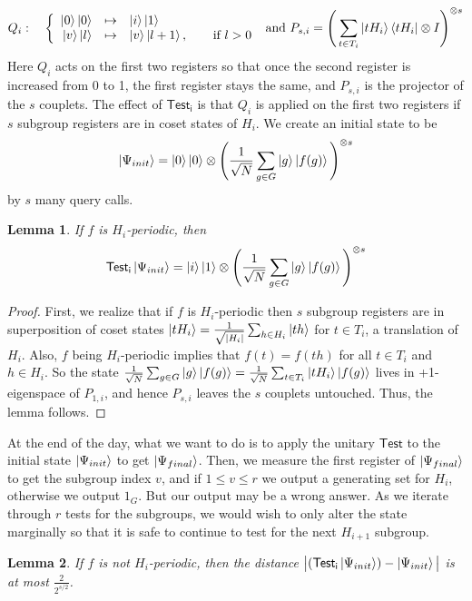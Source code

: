 \documentclass[12pt]{article}
\theoremstyle{plain}
\newtheorem{lem}{Lemma}
\theoremstyle{definition}
\begin{document}
$$Q_i:\quad\left\lbrace
\begin{array}{rcl}
\left\vert{0}\right\rangle\left\vert{0}\right\rangle & \mapsto & \left\vert{i}\right\rangle\left\vert{1}\right\rangle \\
\left\vert{v}\right\rangle\left\vert{l}\right\rangle & \mapsto & \left\vert{v}\right\rangle\left\vert{l+1}\right\rangle,
\qquad\text{if $l>0$}
\end{array}
\right.
\text{ and  } P_{s,i}=\Bigg(\sum_{t\in T_i}\left\vert{tH_i}\right\rangle\left\langle{tH_i}\right\vert\otimes I\Bigg)^{\otimes s}
$$
Here $Q_i$ acts on the first two registers so that once the second register is increased from 0 to 1, the first register stays the same, and $P_{s,i}$ is the projector of the $s$ couplets. The effect of $\mathsf{Test_i}$ is that $Q_i$ is applied on the first two registers if $s$ subgroup registers are in coset states of $H_i$.
\newline
We create an initial state to be
$$\left\vert{\Psi_{init}}\right\rangle=\left\vert{0}\right\rangle\left\vert{0}\right\rangle\otimes\Bigg(\frac{1}{\sqrt{N}}\sum_{g\in G}\left\vert{g}\right\rangle\left\vert{f(g)}\right\rangle\Bigg)^{\otimes s}$$
by $s$ many query calls.
\begin{lem}
If $f$ is $H_i$-periodic, then
$$\mathsf{Test_i}\left\vert{\Psi_{init}}\right\rangle=\left\vert{i}\right\rangle\left\vert{1}\right\rangle\otimes\Bigg(\frac{1}{\sqrt{N}}\sum_{g\in G}\left\vert{g}\right\rangle\left\vert{f(g)}\right\rangle\Bigg)^{\otimes s}$$
\end{lem}
\begin{proof}
First, we realize that if $f$ is $H_i$-periodic then $s$ subgroup registers are in superposition of coset states $\left\vert{tH_i}\right\rangle=\frac{1}{\sqrt{|H_i|}}\sum_{h\in H_i}\left\vert{th}\right\rangle$ for $t\in T_i$, a translation of $H_i$. Also, $f$ being $H_i$-periodic implies that $f(t)=f(th)$ for all $t\in T_i$ and $h\in H_i$. So the state $\frac{1}{\sqrt{N}}\sum_{g\in G}\left\vert{g}\right\rangle\left\vert{f(g)}\right\rangle=\frac{1}{\sqrt{N}}\sum_{t\in T_i}\left\vert{tH_i}\right\rangle\left\vert{f(g)}\right\rangle$ lives in +1-eigenspace of $P_{1,i}$, and hence $P_{s,i}$ leaves the $s$ couplets untouched. Thus, the lemma follows.
\end{proof}
\noindent At the end of the day, what we want to do is to apply the unitary $\mathsf{Test}$ to the initial state $\left\vert{\Psi_{init}}\right\rangle$ to get $\left\vert{\Psi_{final}}\right\rangle$. Then, we measure the first register of $\left\vert{\Psi_{final}}\right\rangle$ to get the subgroup index $v$, and if $1\leq v \leq r$ we output a generating set for $H_i$, otherwise we output ${1_G}$. But our output may be a wrong answer.
\newline
As we iterate through $r$ tests for the subgroups, we would wish to only alter the state marginally so that it is safe to continue to test for the next $H_{i+1}$ subgroup.
\begin{lem}
If $f$ is not $H_i$-periodic, then the distance $\big|(\mathsf{Test_i}\left\vert{\Psi_{init}}\right\rangle)-\left\vert{\Psi_{init}}\right\rangle\big|$ is at most $\frac{2}{2^{s/2}}$.
\end{lem}
\end{document}
